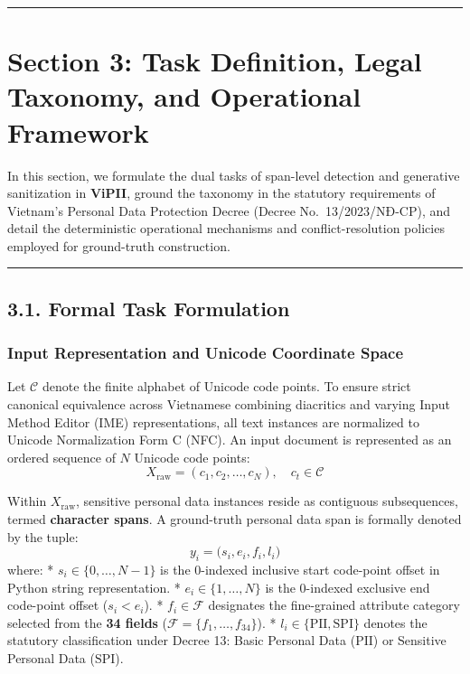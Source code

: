 \documentclass[
]{article}
\begin{document}
\begin{center}\rule{0.5\linewidth}{0.5pt}\end{center}

\section{Section 3: Task Definition, Legal Taxonomy, and Operational
Framework}\label{section-3-task-definition-legal-taxonomy-and-operational-framework}

In this section, we formulate the dual tasks of span-level detection and
generative sanitization in \textbf{ViPII}, ground the taxonomy in the
statutory requirements of Vietnam's Personal Data Protection Decree
(Decree No.~13/2023/NĐ-CP), and detail the deterministic operational
mechanisms and conflict-resolution policies employed for ground-truth
construction.

\begin{center}\rule{0.5\linewidth}{0.5pt}\end{center}

\subsection{3.1. Formal Task Formulation}\label{formal-task-formulation}

\subsubsection{Input Representation and Unicode Coordinate
Space}\label{input-representation-and-unicode-coordinate-space}

Let \(\mathcal{C}\) denote the finite alphabet of Unicode code points.
To ensure strict canonical equivalence across Vietnamese combining
diacritics and varying Input Method Editor (IME) representations, all
text instances are normalized to Unicode Normalization Form C (NFC). An
input document is represented as an ordered sequence of \(N\) Unicode
code points:
\[X_{\text{raw}} = (c_1, c_2, \dots, c_N), \quad c_t \in \mathcal{C}\]

Within \(X_{\text{raw}}\), sensitive personal data instances reside as
contiguous subsequences, termed \textbf{character spans}. A ground-truth
personal data span is formally denoted by the tuple:
\[y_i = \bigl(s_i, e_i, f_i, l_i\bigr)\] where: *
\(s_i \in \{0, \dots, N-1\}\) is the 0-indexed inclusive start
code-point offset in Python string representation. *
\(e_i \in \{1, \dots, N\}\) is the 0-indexed exclusive end code-point
offset (\(s_i < e_i\)). * \(f_i \in \mathcal{F}\) designates the
fine-grained attribute category selected from the \textbf{34 fields}
(\(\mathcal{F} = \{f_1, \dots, f_{34}\}\)). *
\(l_i \in \{\text{PII}, \text{SPI}\}\) denotes the statutory
classification under Decree 13: Basic Personal Data (\(\text{PII}\)) or
Sensitive Personal Data (\(\text{SPI}\)).
\end{document}
